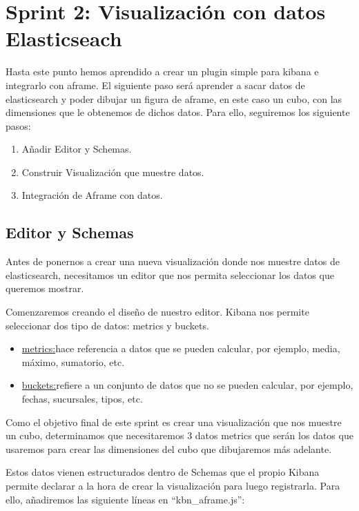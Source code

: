 \documentclass[a4paper, 12pt]{book}
\begin{document}

\section{Sprint 2: Visualización con datos Elasticseach }
\label{sec:sprint2}

Hasta este punto hemos aprendido a crear un plugin simple para kibana e integrarlo con aframe. El siguiente paso será aprender a sacar datos de elasticsearch y poder dibujar un figura de aframe, en este caso un cubo, con las dimensiones que le obtenemos de dichos datos. Para ello, seguiremos los siguiente pasos:
\begin{enumerate}
    \item Añadir Editor y Schemas.
    \item Construir Visualización que muestre datos.
    \item Integración de Aframe con datos.
\end{enumerate}

\subsection{Editor y Schemas}

Antes de ponernos a crear una nueva visualización donde nos muestre datos de elasticsearch, necesitamos un editor que nos permita seleccionar los datos que queremos mostrar. 

Comenzaremos creando el diseño de nuestro editor. Kibana nos permite seleccionar dos tipo de datos: metrics y buckets.
\begin{itemize}
    \item \underline{metrics:}hace referencia a datos que se pueden calcular, por ejemplo, media, máximo, sumatorio, etc.
    \item \underline{buckets:}refiere a un conjunto de datos que no se pueden calcular, por ejemplo, fechas, sucursales, tipos, etc.
\end{itemize}

Como el objetivo final de este sprint es crear una visualización que nos muestre un cubo, determinamos que necesitaremos 3 datos metrics que serán los datos que usaremos para crear las dimensiones del cubo que dibujaremos más adelante.

Estos datos vienen estructurados dentro de Schemas que el propio Kibana permite declarar a la hora de crear la visualización para luego registrarla. Para ello, añadiremos las siguiente líneas en “kbn\_aframe.js”:
\end{document}
